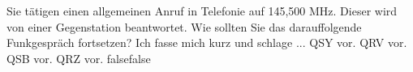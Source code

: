     {Sie tätigen einen allgemeinen Anruf in Telefonie auf 145,500 MHz. Dieser wird von einer Gegenstation beantwortet. Wie sollten Sie das darauffolgende Funkgespräch fortsetzen? Ich fasse mich kurz und schlage ...}
    {QSY vor.}
    {QRV vor.}
    {QSB vor.}
    {QRZ vor.}
    {false}{false}